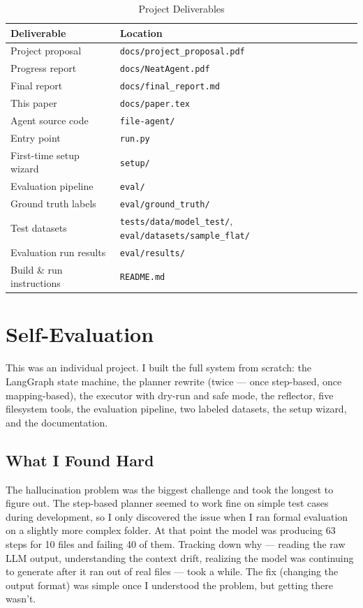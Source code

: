 \documentclass{article}
\begin{document}
\begin{table}[H]
\centering
\caption{Project Deliverables}
\begin{tabular}{ll}
\toprule
\textbf{Deliverable} & \textbf{Location} \\
\midrule
Project proposal          & \texttt{docs/project\_proposal.pdf} \\
Progress report           & \texttt{docs/NeatAgent.pdf} \\
Final report              & \texttt{docs/final\_report.md} \\
This paper                & \texttt{docs/paper.tex} \\
Agent source code         & \texttt{file-agent/} \\
Entry point               & \texttt{run.py} \\
First-time setup wizard   & \texttt{setup/} \\
Evaluation pipeline       & \texttt{eval/} \\
Ground truth labels       & \texttt{eval/ground\_truth/} \\
Test datasets             & \texttt{tests/data/model\_test/}, \texttt{eval/datasets/sample\_flat/} \\
Evaluation run results    & \texttt{eval/results/} \\
Build \& run instructions & \texttt{README.md} \\
\bottomrule
\end{tabular}
\end{table}

\section{Self-Evaluation}

This was an individual project. I built the full system from scratch: the LangGraph state machine, the planner rewrite (twice — once step-based, once mapping-based), the executor with dry-run and safe mode, the reflector, five filesystem tools, the evaluation pipeline, two labeled datasets, the setup wizard, and the documentation.

\subsection{What I Found Hard}

The hallucination problem was the biggest challenge and took the longest to figure out. The step-based planner seemed to work fine on simple test cases during development, so I only discovered the issue when I ran formal evaluation on a slightly more complex folder. At that point the model was producing 63 steps for 10 files and failing 40 of them. Tracking down why — reading the raw LLM output, understanding the context drift, realizing the model was continuing to generate after it ran out of real files — took a while. The fix (changing the output format) was simple once I understood the problem, but getting there wasn't.
\end{document}
